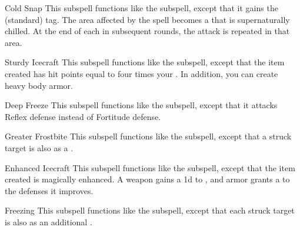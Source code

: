 \begin{ability}[\nth{2}]{Cold Snap}
This subspell functions like the  subspell, except that it gains the  (standard) tag.
The area affected by the spell becomes a  that is supernaturally chilled.
At the end of each  in subsequent rounds, the attack is repeated in that area.
\end{ability}
\vspace{0.25em}


\begin{ability}[\nth{2}]{Sturdy Icecraft}
This subspell functions like the  subspell, except that the item created has hit points equal to four times your .
In addition, you can create heavy body armor.
\end{ability}
\vspace{0.25em}


\begin{ability}[\nth{3}]{Deep Freeze}
This subspell functions like the  subspell, except that it attacks Reflex defense instead of Fortitude defense.
\end{ability}
\vspace{0.25em}


\begin{ability}[\nth{3}]{Greater Frostbite}
This subspell functions like the  subspell, except that a struck target is also  as a .
\end{ability}
\vspace{0.25em}


\begin{ability}[\nth{4}]{Enhanced Icecraft}
This subspell functions like the  subspell, except that the item created is magically enhanced.
A weapon gains a \plus1d  to , and armor grants a   to the defenses it improves.
\end{ability}
\vspace{0.25em}


\begin{ability}[\nth{4}]{Freezing}
This subspell functions like the  subspell, except that each struck target is also  as an additional .
\end{ability}
\vspace{0.25em}


